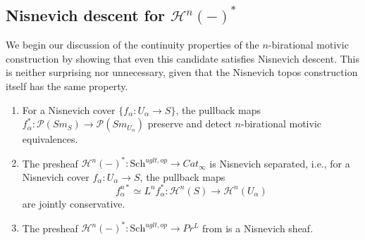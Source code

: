 \subsection{Nisnevich descent for $\mathcal{H}^{n}(-)^*$}
We begin our discussion of the continuity properties of the $n$-birational motivic construction by showing that even this candidate satisfies Nisnevich descent. This is neither surprising nor unnecessary, given that the Nisnevich topos construction itself has the same property.  
\begin{prop}\label{bir detect} 

       \begin{enumerate}
           \item For a Nisnevich cover $\{f_\alpha: U_\alpha\to S\}$, the pullback maps $f_{\alpha}^*: \mathcal{P}(Sm_S)\to \mathcal{P}(Sm_{U_\alpha})$ preserve and detect $n$-birational motivic equivalences.
           \item  The presheaf $\mathcal{H}^{n}(-)^*:\mathrm{Sch}^{ uglt, op}\to Cat_\infty$ is Nisnevich separated, i.e., for a Nisnevich cover $f_\alpha: U_\alpha\to S$, the pullback maps $$f_\alpha^{n*}\simeq L^nf_\alpha^{*}: \mathcal{H}^{n}(S)\to \mathcal{H}^{n}(U_\alpha)$$ are jointly conservative. 
           \item The presheaf $\mathcal{H}^{n}(-)^{*}:\mathrm{Sch}^{ uglt, op}\to Pr^L$ from  is a Nisnevich sheaf.
       \end{enumerate}  
\end{prop}    
